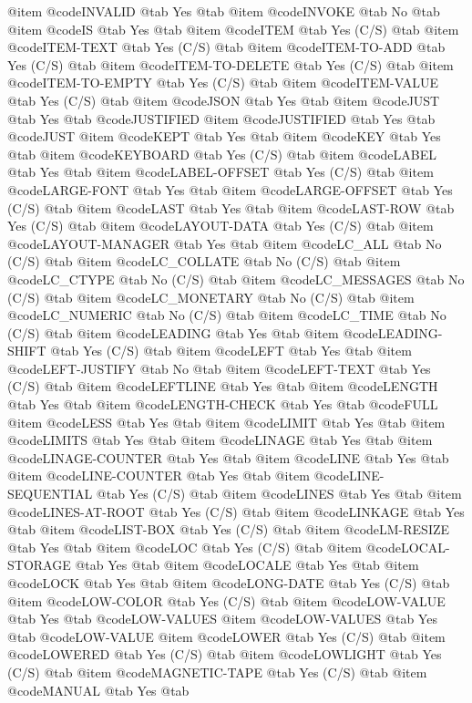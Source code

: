 @item @code{INVALID} @tab Yes @tab 
@item @code{INVOKE} @tab No @tab 
@item @code{IS} @tab Yes @tab 
@item @code{ITEM} @tab Yes	(C/S) @tab 
@item @code{ITEM-TEXT} @tab Yes	(C/S) @tab 
@item @code{ITEM-TO-ADD} @tab Yes	(C/S) @tab 
@item @code{ITEM-TO-DELETE} @tab Yes	(C/S) @tab 
@item @code{ITEM-TO-EMPTY} @tab Yes	(C/S) @tab 
@item @code{ITEM-VALUE} @tab Yes	(C/S) @tab 
@item @code{JSON} @tab Yes @tab 
@item @code{JUST} @tab Yes @tab @code{JUSTIFIED}
@item @code{JUSTIFIED} @tab Yes @tab @code{JUST}
@item @code{KEPT} @tab Yes @tab 
@item @code{KEY} @tab Yes @tab 
@item @code{KEYBOARD} @tab Yes	(C/S) @tab 
@item @code{LABEL} @tab Yes @tab 
@item @code{LABEL-OFFSET} @tab Yes	(C/S) @tab 
@item @code{LARGE-FONT} @tab Yes @tab 
@item @code{LARGE-OFFSET} @tab Yes	(C/S) @tab 
@item @code{LAST} @tab Yes @tab 
@item @code{LAST-ROW} @tab Yes	(C/S) @tab 
@item @code{LAYOUT-DATA} @tab Yes	(C/S) @tab 
@item @code{LAYOUT-MANAGER} @tab Yes @tab 
@item @code{LC_ALL} @tab No	(C/S) @tab 
@item @code{LC_COLLATE} @tab No	(C/S) @tab 
@item @code{LC_CTYPE} @tab No	(C/S) @tab 
@item @code{LC_MESSAGES} @tab No	(C/S) @tab 
@item @code{LC_MONETARY} @tab No	(C/S) @tab 
@item @code{LC_NUMERIC} @tab No	(C/S) @tab 
@item @code{LC_TIME} @tab No	(C/S) @tab 
@item @code{LEADING} @tab Yes @tab 
@item @code{LEADING-SHIFT} @tab Yes	(C/S) @tab 
@item @code{LEFT} @tab Yes @tab 
@item @code{LEFT-JUSTIFY} @tab No @tab 
@item @code{LEFT-TEXT} @tab Yes	(C/S) @tab 
@item @code{LEFTLINE} @tab Yes @tab 
@item @code{LENGTH} @tab Yes @tab 
@item @code{LENGTH-CHECK} @tab Yes @tab @code{FULL}
@item @code{LESS} @tab Yes @tab 
@item @code{LIMIT} @tab Yes @tab 
@item @code{LIMITS} @tab Yes @tab 
@item @code{LINAGE} @tab Yes @tab 
@item @code{LINAGE-COUNTER} @tab Yes @tab 
@item @code{LINE} @tab Yes @tab 
@item @code{LINE-COUNTER} @tab Yes @tab 
@item @code{LINE-SEQUENTIAL} @tab Yes	(C/S) @tab 
@item @code{LINES} @tab Yes @tab 
@item @code{LINES-AT-ROOT} @tab Yes	(C/S) @tab 
@item @code{LINKAGE} @tab Yes @tab 
@item @code{LIST-BOX} @tab Yes	(C/S) @tab 
@item @code{LM-RESIZE} @tab Yes @tab 
@item @code{LOC} @tab Yes	(C/S) @tab 
@item @code{LOCAL-STORAGE} @tab Yes @tab 
@item @code{LOCALE} @tab Yes @tab 
@item @code{LOCK} @tab Yes @tab 
@item @code{LONG-DATE} @tab Yes	(C/S) @tab 
@item @code{LOW-COLOR} @tab Yes	(C/S) @tab 
@item @code{LOW-VALUE} @tab Yes @tab @code{LOW-VALUES}
@item @code{LOW-VALUES} @tab Yes @tab @code{LOW-VALUE}
@item @code{LOWER} @tab Yes	(C/S) @tab 
@item @code{LOWERED} @tab Yes	(C/S) @tab 
@item @code{LOWLIGHT} @tab Yes	(C/S) @tab 
@item @code{MAGNETIC-TAPE} @tab Yes	(C/S) @tab 
@item @code{MANUAL} @tab Yes @tab 

